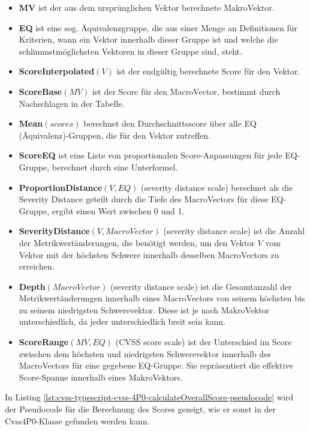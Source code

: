\begin{itemize}[noitemsep]
    \item \textbf{MV} ist der aus dem ursprünglichen Vektor berechnete MakroVektor.
    \item \textbf{EQ} ist eine sog. Äquivalenzgruppe, die aus einer Menge an Definitionen für Kriterien, wann ein Vektor innerhalb dieser Gruppe ist und welche die schlimmstmöglichsten Vektoren in dieser Gruppe sind, steht.
    \item \textbf{ScoreInterpolated$(V)$} ist der endgültig berechnete Score für den Vektor.
    \item \textbf{ScoreBase$(MV)$} ist der Score für den MacroVector, bestimmt durch Nachschlagen in der Tabelle.
    \item \textbf{Mean$(scores)$} berechnet den Durchschnittsscore über alle EQ (Äquivalenz)-Gruppen, die für den Vektor zutreffen.
    \item \textbf{ScoreEQ} ist eine Liste von proportionalen Score-Anpassungen für jede EQ-Gruppe, berechnet durch eine Unterformel.
    \item \textbf{ProportionDistance$(V, EQ)$} (severity distance scale) berechnet als die Severity Distance geteilt durch die Tiefe des MacroVectors für diese EQ-Gruppe, ergibt einen Wert zwischen 0 und 1.
    \item \textbf{SeverityDistance$(V, MacroVector)$} (severity distance scale) ist die Anzahl der Metrikwertänderungen, die benötigt werden, um den Vektor $V$ vom Vektor mit der höchsten Schwere innerhalb desselben MacroVectors zu erreichen.
    \item \textbf{Depth$(MacroVector)$} (severity distance scale) ist die Gesamtanzahl der Metrikwertänderungen innerhalb eines MacroVectors von seinem höchsten bis zu seinem niedrigsten Schwerevektor.
    Diese ist je nach MakroVektor unterschiedlich, da jeder unterschiedlich breit sein kann.
    \item \textbf{ScoreRange$(MV, EQ)$} (CVSS score scale) ist der Unterschied im Score zwischen dem höchsten und niedrigsten Schwerevektor innerhalb des MacroVectors für eine gegebene EQ-Gruppe.
    Sie repräsentiert die effektive Score-Spanne innerhalb eines MakroVektors.
\end{itemize}

In Listing \ref{lst:cvss-typescript-cvss-4P0-calculateOverallScore-pseudocode} wird der Pseudocode für die Berechnung des Scores gezeigt, wie er sonst in der Cvss4P0-Klasse gefunden werden kann.

